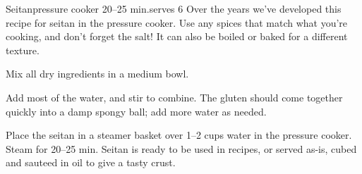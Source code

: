 \begin{recipe}{Seitan}{pressure cooker \hfill 20--25 min.}{\hfill serves 6}
  \freeform Over the years we've developed this recipe for seitan in the pressure cooker. Use any spices that match what you're cooking, and don't forget the salt! It can also be boiled or baked for a different texture.

Mix all dry ingredients in a medium bowl.

Add most of the water, and stir to combine. The gluten should come together quickly into a damp spongy ball; add more water as needed.

\newstep Place the seitan in a steamer basket over 1--2 cups water in the pressure cooker. Steam for 20--25 min.
\newstep Seitan is ready to be used in recipes, or served as-is, cubed and sauteed in oil to give a tasty crust.
\end{recipe}